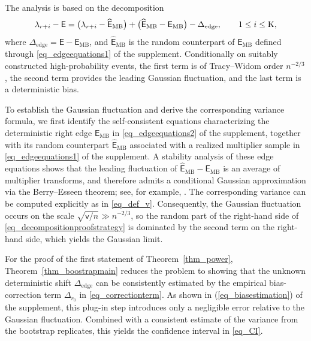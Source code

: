 \documentclass[12pt]{article}
\theoremstyle{plain}
\numberwithin{equation}{section}
\begin{document}
The analysis is based on the decomposition \vspace*{-10pt}
\begin{equation}\label{eq_decompositionproofstrategy}
	\vspace*{-10pt}
	\lambda_{r+i}-\mathsf E
	=
	\bigl(\lambda_{r+i}-\widehat{\mathsf E}_{\mathrm{MB}}\bigr)
	+
	\bigl(\widehat{\mathsf E}_{\mathrm{MB}}-\mathsf E_{\mathrm{MB}}\bigr)
	-
	\Delta_{\mathrm{edge}},
	\qquad 1\le i\le \mathrm K,
\end{equation}
where $\Delta_{\mathrm{edge}}=\mathsf E-\mathsf E_{\mathrm{MB}}$, and $\widehat{\mathsf E}_{\mathrm{MB}}$ is the random counterpart of $\mathsf E_{\mathrm{MB}}$ defined through \eqref{eq_edgeequations1} of the supplement. Conditionally on suitably constructed high-probability events, the first term is of Tracy--Widom order $n^{-2/3}$, the second term provides the leading Gaussian fluctuation, and the last term is a deterministic bias. 

To establish the Gaussian fluctuation and derive the corresponding variance formula, we first identify the self-consistent equations characterizing the deterministic right edge $\mathsf E_{\mathrm{MB}}$ in \eqref{eq_edgeequations2} of the supplement, together with its random counterpart $\widehat{\mathsf E}_{\mathrm{MB}}$ associated with a realized multiplier sample in \eqref{eq_edgeequations1} of the supplement. A stability analysis of these edge equations shows that the leading fluctuation of $\widehat{\mathsf E}_{\mathrm{MB}}-\mathsf E_{\mathrm{MB}}$ is an average of multiplier transforms, and therefore admits a conditional Gaussian approximation via the Berry--Esseen theorem; see, for example, \citet[Section 2.11]{vdV1998}. The corresponding variance can be computed explicitly as in \eqref{eq_def_v}. Consequently, the Gaussian fluctuation occurs on the scale $\sqrt{\mathsf v/n}\gg n^{-2/3}$, so the random part of the right-hand side of \eqref{eq_decompositionproofstrategy} is dominated by the second term on the right-hand side, which yields the Gaussian limit. 


For the proof of the first statement of Theorem~\ref{thm_power}, Theorem~\ref{thm_boostrapmain} reduces the problem to showing that the unknown deterministic shift $\Delta_{\mathrm{edge}}$ can be consistently estimated by the empirical bias-correction term $\Delta_{r_0}$ in \eqref{eq_correctionterm}. As shown in (\ref{eq_biasestimation}) of the supplement, this plug-in step introduces only a negligible error relative to the Gaussian fluctuation. Combined with a consistent estimate of the variance from the bootstrap replicates, this yields the confidence interval in \eqref{eq_CI}. 
\end{document}
